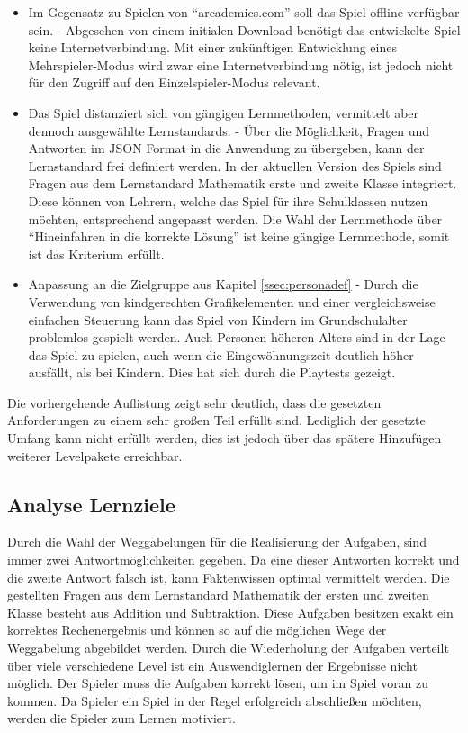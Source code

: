 \begin{itemize}
    \item{Im Gegensatz zu Spielen von \enquote{arcademics.com} soll das Spiel offline verfügbar sein. - Abgesehen von einem initialen Download benötigt das entwickelte Spiel keine Internetverbindung. Mit einer zukünftigen Entwicklung eines Mehrspieler-Modus wird zwar eine Internetverbindung nötig, ist jedoch nicht für den Zugriff auf den Einzelspieler-Modus relevant.}
    \item{Das Spiel distanziert sich von gängigen Lernmethoden, vermittelt aber dennoch ausgewählte Lernstandards. - Über die Möglichkeit, Fragen und Antworten im JSON Format in die Anwendung zu übergeben, kann der Lernstandard frei definiert werden. In der aktuellen Version des Spiels sind Fragen aus dem Lernstandard Mathematik erste und zweite Klasse integriert. Diese können von Lehrern, welche das Spiel für ihre Schulklassen nutzen möchten, entsprechend angepasst werden. Die Wahl der Lernmethode über \enquote{Hineinfahren in die korrekte Lösung} ist keine gängige Lernmethode, somit ist das Kriterium erfüllt.}
    \item{Anpassung an die Zielgruppe aus Kapitel \ref{ssec:personadef} - Durch die Verwendung von kindgerechten Grafikelementen und einer vergleichsweise einfachen Steuerung kann das Spiel von Kindern im Grundschulalter problemlos gespielt werden. Auch Personen höheren Alters sind in der Lage das Spiel zu spielen, auch wenn die Eingewöhnungszeit deutlich höher ausfällt, als bei Kindern. Dies hat sich durch die Playtests gezeigt.}
\end{itemize}
Die vorhergehende Auflistung zeigt sehr deutlich, dass die gesetzten Anforderungen zu einem sehr großen Teil erfüllt sind. Lediglich der gesetzte Umfang kann nicht erfüllt werden, dies ist jedoch über das spätere Hinzufügen weiterer Levelpakete erreichbar.

\subsection{Analyse Lernziele}
Durch die Wahl der Weggabelungen für die Realisierung der Aufgaben, sind immer zwei Antwortmöglichkeiten gegeben. Da eine dieser Antworten korrekt und die zweite Antwort falsch ist, kann Faktenwissen optimal vermittelt werden. Die gestellten Fragen aus dem Lernstandard Mathematik der ersten und zweiten Klasse besteht aus Addition und Subtraktion. Diese Aufgaben besitzen exakt ein korrektes Rechenergebnis und können so auf die möglichen Wege der Weggabelung abgebildet werden. Durch die Wiederholung der Aufgaben verteilt über viele verschiedene Level ist ein Auswendiglernen der Ergebnisse nicht möglich. Der Spieler muss die Aufgaben korrekt lösen, um im Spiel voran zu kommen. Da Spieler ein Spiel in der Regel erfolgreich abschließen möchten, werden die Spieler zum Lernen motiviert.

